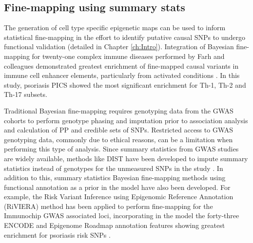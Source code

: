 \subsection{Fine-mapping using summary stats}

The generation of cell type specific epigenetic maps can be used to inform statistical fine-mapping in the effort to identify putative causal SNPs to undergo functional validation (detailed in Chapter \ref{ch:Intro}). Integration of Bayesian fine-mapping for twenty-one complex immune diseases performed by Farh and colleagues demonstrated greatest enrichment of fine-mapped causal variants in immune cell enhancer elements, particularly from activated conditions \parencite{Farh2015}. In this study, psoriasis PICS showed the most significant enrichment for Th-1, Th-2 and Th-17 subsets.

Traditional Bayesian fine-mapping requires genotyping data from the GWAS cohorts to perform genotype phasing and imputation prior to association analysis and calculation of PP and credible sets of SNPs. Restricted access to GWAS genotyping data, commonly due to ethical reasons, can be a limitation when performing this type of analysis. Since summary statistics from GWAS studies are widely available, methods like DIST have been developed to impute summary statistics instead of genotypes for the unmeasured SNPs in the study \parencite{Lee2013}. In addition to this, summary statistics Bayesian fine-mapping methods using functional annotation as a prior in the model have also been developed. For example, the Risk Variant Inference using Epigenomic Reference Annotation (RiVIERA) method has been applied to perform fine-mapping for the Immunochip GWAS associated loci, incorporating in the model the forty-three ENCODE and Epigenome Roadmap annotation features showing greatest enrichment for psoriasis risk SNPs \parencite{Li2016}. 






